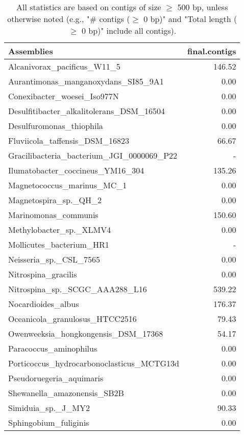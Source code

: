 \documentclass[12pt,a4paper]{article}
\begin{document}
\begin{table}[ht]
\begin{center}
\caption{All statistics are based on contigs of size $\geq$ 500 bp, unless otherwise noted (e.g., "\# contigs ($\geq$ 0 bp)" and "Total length ($\geq$ 0 bp)" include all contigs).}
\begin{tabular}{|l*{1}{|r}|}
\hline
Assemblies & final.contigs \\ \hline
Alcanivorax\_pacificus\_W11\_5 & 146.52 \\ \hline
Aurantimonas\_manganoxydans\_SI85\_9A1 & 0.00 \\ \hline
Conexibacter\_woesei\_Iso977N & 0.00 \\ \hline
Desulfitibacter\_alkalitolerans\_DSM\_16504 & 0.00 \\ \hline
Desulfuromonas\_thiophila & 0.00 \\ \hline
Fluviicola\_taffensis\_DSM\_16823 & 66.67 \\ \hline
Gracilibacteria\_bacterium\_JGI\_0000069\_P22 & - \\ \hline
Ilumatobacter\_coccineus\_YM16\_304 & 135.26 \\ \hline
Magnetococcus\_marinus\_MC\_1 & 0.00 \\ \hline
Magnetospira\_sp.\_QH\_2 & 0.00 \\ \hline
Marinomonas\_communis & 150.60 \\ \hline
Methylobacter\_sp.\_XLMV4 & 0.00 \\ \hline
Mollicutes\_bacterium\_HR1 & - \\ \hline
Neisseria\_sp.\_CSL\_7565 & 0.00 \\ \hline
Nitrospina\_gracilis & 0.00 \\ \hline
Nitrospina\_sp.\_SCGC\_AAA288\_L16 & 539.22 \\ \hline
Nocardioides\_albus & 176.37 \\ \hline
Oceanicola\_granulosus\_HTCC2516 & 79.43 \\ \hline
Owenweeksia\_hongkongensis\_DSM\_17368 & 54.17 \\ \hline
Paracoccus\_aminophilus & 0.00 \\ \hline
Porticoccus\_hydrocarbonoclasticus\_MCTG13d & 0.00 \\ \hline
Pseudoruegeria\_aquimaris & 0.00 \\ \hline
Shewanella\_amazonensis\_SB2B & 0.00 \\ \hline
Simiduia\_sp.\_J\_MY2 & 90.33 \\ \hline
Sphingobium\_fuliginis & 0.00 \\ \hline

\end{tabular}
\end{center}
\end{table}
\end{document}
